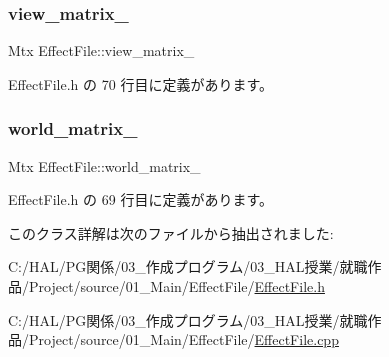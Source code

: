 \subsubsection{\texorpdfstring{view\+\_\+matrix\+\_\+}{view\_matrix\_}}
{\footnotesize\ttfamily Mtx Effect\+File\+::view\+\_\+matrix\+\_\+}



 Effect\+File.\+h の 70 行目に定義があります。

\mbox{\label{class_effect_file_a95cfdd66e61e80e39238d5f889488a43}} 
\subsubsection{\texorpdfstring{world\+\_\+matrix\+\_\+}{world\_matrix\_}}
{\footnotesize\ttfamily Mtx Effect\+File\+::world\+\_\+matrix\+\_\+}



 Effect\+File.\+h の 69 行目に定義があります。



このクラス詳解は次のファイルから抽出されました\+:\begin{DoxyCompactItemize}
\item 
C\+:/\+H\+A\+L/\+P\+G関係/03\+\_\+作成プログラム/03\+\_\+\+H\+A\+L授業/就職作品/\+Project/source/01\+\_\+\+Main/\+Effect\+File/\mbox{\hyperlink{_effect_file_8h}{Effect\+File.\+h}}\item 
C\+:/\+H\+A\+L/\+P\+G関係/03\+\_\+作成プログラム/03\+\_\+\+H\+A\+L授業/就職作品/\+Project/source/01\+\_\+\+Main/\+Effect\+File/\mbox{\hyperlink{_effect_file_8cpp}{Effect\+File.\+cpp}}\end{DoxyCompactItemize}
